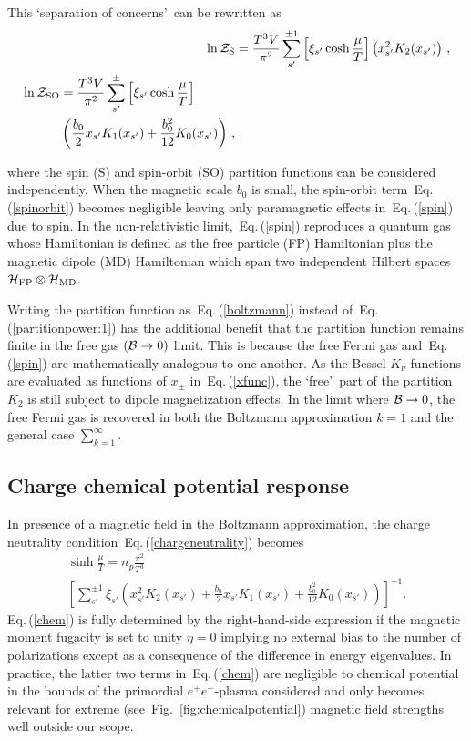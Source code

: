 \documentclass[aps,prd,floatfix,reprint]{revtex4-2}
\newcommand{\req}[1]{Eq.\,(\ref{#1})}
\newcommand{\rf}[1]{Fig.~{\ref{#1}}}
\begin{document}
This \lq separation of concerns\rq\ can be rewritten as
\begin{align}
 \label{spin}
 \ln{\cal Z}_{\rm S}&=\frac{T^{3}V}{\pi^{2}}\sum_{s'}^{\pm1}\left[\xi_{s'}\cosh{\frac{\mu}{T}}\right]\left(x_{s'}^{2}K_{2}(x_{s'})\right)\,,\\
 \begin{split}
 \label{spinorbit}
 \ln{\cal Z}_{\rm SO}&=\frac{T^{3}V}{\pi^{2}}\sum_{s'}^{\pm}\left[\xi_{s'}\cosh{\frac{\mu}{T}}\right]\\
 &\left(\frac{b_{0}}{2}x_{s'}K_{1}(x_{s'})+\frac{b_{0}^{2}}{12}K_{0}(x_{s'})\right)\,, 
 \end{split}
\end{align}

where the spin (S) and spin-orbit (SO) partition functions can be considered independently. When the magnetic scale $b_{0}$ is small, the spin-orbit term~\req{spinorbit} becomes negligible leaving only paramagnetic effects in~\req{spin} due to spin. In the non-relativistic limit,~\req{spin} reproduces a quantum gas whose Hamiltonian is defined as the free particle (FP) Hamiltonian plus the magnetic dipole (MD) Hamiltonian which span two independent Hilbert spaces ${\cal H}_{\rm FP}\otimes{\cal H}_{\rm MD}$.

Writing the partition function as~\req{boltzmann} instead of~\req{partitionpower:1} has the additional benefit that the partition function remains finite in the free gas $({\cal B}\rightarrow0)$ limit. This is because the free Fermi gas and~\req{spin} are mathematically analogous to one another. As the Bessel $K_{\nu}$ functions are evaluated as functions of $x_{\pm}$ in~\req{xfunc}, the \lq free\rq\ part of the partition $K_{2}$ is still subject to dipole magnetization effects. In the limit where ${\cal B}\rightarrow0$, the free Fermi gas is recovered in both the Boltzmann approximation $k=1$ and the general case $\sum_{k=1}^{\infty}$.

\subsection{Charge chemical potential response}
\label{sec:chem}
\noindent In presence of a magnetic field in the Boltzmann approximation, the charge neutrality condition~\req{chargeneutrality} becomes
\begin{multline}
 \label{chem}
 \sinh\frac{\mu}{T}=n_{p}\frac{\pi^{2}}{T^{3}}\\
 \left[\sum_{s'}^{\pm1}\xi_{s'}\!\left(\!x_{s'}^{2}K_{2}(x_{s'})\!+\!\frac{b_{0}}{2}x_{s'}K_{1}(x_{s'})\!+\!\frac{b_{0}^{2}}{12}K_{0}(x_{s'}\!)\!\right)\!\right]^{-1}\!.
\end{multline}
\req{chem} is fully determined by the right-hand-side expression if the magnetic moment fugacity is set to unity $\eta=0$ implying no external bias to the number of polarizations except as a consequence of the difference in energy eigenvalues. In practice, the latter two terms in~\req{chem} are negligible to chemical potential in the bounds of the primordial $e^{+}e^{-}$-plasma considered and only becomes relevant for extreme (see~\rf{fig:chemicalpotential}) magnetic field strengths well outside our scope.
\end{document}
